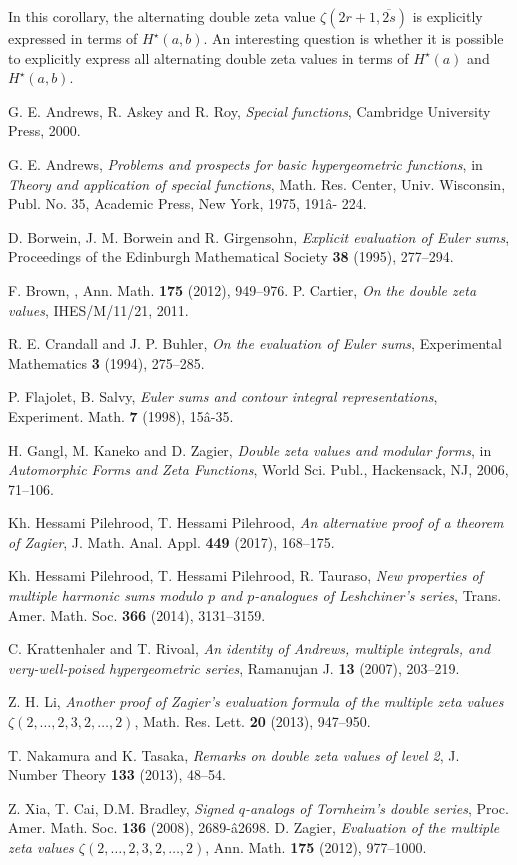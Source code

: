 \documentclass[reqno]{amsart}
\theoremstyle{definition}
\theoremstyle{remark}
\numberwithin{equation}{section}
\begin{document}
In this corollary,  the alternating double zeta value $\zeta(2r+1, \overline{2s})$ is explicitly expressed in terms of $H^{\star}(a, b)$. An interesting question is whether it is possible to explicitly express all alternating double zeta values in terms of $H^{\star}(a)$ and $H^{\star}(a, b)$.

\begin{thebibliography}{10}
 G. E. Andrews, R. Askey and R. Roy, \emph{Special functions}, Cambridge University Press, 2000.

 G. E. Andrews, \emph{Problems and prospects for basic hypergeometric functions}, in \emph{
Theory and application of special functions},  Math. Res. Center, Univ. Wisconsin, Publ. No. 35,   Academic Press, New York, 1975, 191â-
224.

 D. Borwein, J. M. Borwein and R. Girgensohn, \emph{Explicit evaluation of Euler sums}, Proceedings of the Edinburgh Mathematical Society \textbf{38} (1995), 277--294.

 F. Brown, ,  Ann. Math. \textbf{175} (2012), 949--976.
 P. Cartier, \emph{On the double zeta values}, IHES/M/11/21, 2011.

 R. E. Crandall and J. P. Buhler, \emph{On the evaluation of Euler sums}, Experimental Mathematics \textbf{3} (1994), 275--285.

 P. Flajolet, B. Salvy, \emph{Euler sums and contour integral representations}, Experiment. Math. \textbf{7} (1998), 15â-35.

 H. Gangl, M. Kaneko and D. Zagier, \emph{Double zeta values and modular forms}, in \emph{Automorphic Forms and Zeta Functions}, World Sci. Publ., Hackensack, NJ, 2006, 71--106.

 Kh. Hessami Pilehrood, T. Hessami Pilehrood, \emph{An alternative proof of a theorem of Zagier}, J. Math. Anal. Appl. \textbf{449} (2017), 168--175.

 Kh. Hessami Pilehrood, T. Hessami Pilehrood, R. Tauraso, \emph{New properties of multiple harmonic sums modulo $p$ and $p$-analogues of Leshchiner's series},   Trans. Amer. Math. Soc. \textbf{366} (2014), 3131--3159.

 C. Krattenhaler and T. Rivoal, \emph{An identity of Andrews, multiple integrals, and very-well-poised hypergeometric series}, Ramanujan J. \textbf{13} (2007), 203--219.

 Z. H. Li, \emph{Another proof of Zagier's evaluation formula of the multiple zeta values $\zeta(2,\ldots,2,3,2,\ldots,2)$}, Math. Res. Lett. \textbf{20} (2013), 947--950.

 T. Nakamura and K. Tasaka, \emph{Remarks on double zeta values of level 2}, J. Number Theory \textbf{133} (2013), 48--54.

 Z. Xia, T. Cai, D.M. Bradley, \emph{Signed $q$-analogs of Tornheim's double series}, Proc. Amer. Math. Soc. \textbf{136} (2008), 2689-â2698.
  D. Zagier, \emph{Evaluation of the multiple zeta values $\zeta(2,\ldots,2,3,2,\ldots,2)$}, Ann. Math. \textbf{175} (2012), 977--1000.
\end{thebibliography}
\end{document}
